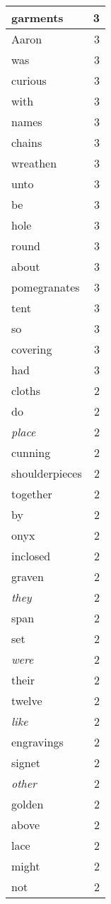 \begin{center}
\begin{longtable}{l|r}
garments & 3 \\ \hline
Aaron & 3 \\ \hline
was & 3 \\ \hline
curious & 3 \\ \hline
with & 3 \\ \hline
names & 3 \\ \hline
chains & 3 \\ \hline
wreathen & 3 \\ \hline
unto & 3 \\ \hline
be & 3 \\ \hline
hole & 3 \\ \hline
round & 3 \\ \hline
about & 3 \\ \hline
pomegranates & 3 \\ \hline
tent & 3 \\ \hline
so & 3 \\ \hline
covering & 3 \\ \hline
had & 3 \\ \hline
cloths & 2 \\ \hline
do & 2 \\ \hline
\emph{place} & 2 \\ \hline
cunning & 2 \\ \hline
shoulderpieces & 2 \\ \hline
together & 2 \\ \hline
by & 2 \\ \hline
onyx & 2 \\ \hline
inclosed & 2 \\ \hline
graven & 2 \\ \hline
\emph{they} & 2 \\ \hline
span & 2 \\ \hline
set & 2 \\ \hline
\emph{were} & 2 \\ \hline
their & 2 \\ \hline
twelve & 2 \\ \hline
\emph{like} & 2 \\ \hline
engravings & 2 \\ \hline
signet & 2 \\ \hline
\emph{other} & 2 \\ \hline
golden & 2 \\ \hline
above & 2 \\ \hline
lace & 2 \\ \hline
might & 2 \\ \hline
not & 2 \\ \hline

\end{longtable}
\end{center}
